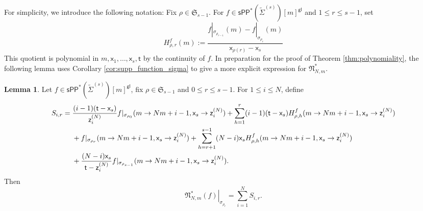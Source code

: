 \documentclass[11pt]{article}
\newcommand{\sPP}{\mathsf{sPP}}
\newcommand{\spp}{\sPP}
\theoremstyle{definition}
\newtheorem{lemma}[definition]{Lemma}
\begin{document}
For simplicity, we introduce the following notation:
Fix $\rho\in \mathfrak S_{s-1}$. For
$f\in \spp^{\ast}(\tilde{\Sigma}^{(s)})[m]^{\mathsf{gl}}$ and $1\le r\le s-1$, set
\[
	H_{\rho,r}^f(m):=
	\frac{f|_{\sigma_{\rho_{r-1}}}(m)-f|_{\sigma_{\rho_r}}(m)}{\mathsf{x}_{\rho(r)}-\mathsf{x}_s}
\]
This quotient is polynomial in $m,\mathsf{x}_1,\dots,\mathsf{x}_s,\mathsf{t}$ by the continuity of $f$.
In preparation for the proof of Theorem \ref{thm:polynomiality}, the following
lemma uses Corollary \ref{cor:supp_function_sigma} to give a more explicit
expression for $\mathfrak N_{N,m}^{\ast}$.

\begin{lemma}
	\label{lem:contribution-formula-m}
	Let $f\in \spp^{\ast}(\tilde{\Sigma}^{(s)})[m]^{\mathsf{gl}}$, fix $\rho\in \mathfrak S_{s-1}$ and $0\le r\le s-1$.
	For $1\le i\le N$, define
	\begin{align}
		S_{i,r}={}&
		\frac{(i-1)(\mathsf{t}-\mathsf{x}_s)}{\mathsf{z}_i^{(N)}}f|_{\sigma_{\rho_0}}(m\to Nm+i-1,\mathsf{x}_s\to \mathsf{z}_i^{(N)})
		+\sum_{h=1}^{r}(i-1)(\mathsf{t}-\mathsf{x}_s)H_{\rho,h}^f(m\to Nm+i-1,\mathsf{x}_s\to \mathsf{z}_i^{(N)})\notag\\
				  &+f|_{\sigma_{\rho_r}}(m\to Nm+i-1,\mathsf{x}_s\to \mathsf{z}_i^{(N)})
				  +\sum_{h=r+1}^{s-1}(N-i)\mathsf{x}_sH_{\rho,h}^f(m\to Nm+i-1,\mathsf{x}_s\to \mathsf{z}_i^{(N)})\notag\\
				  &+\frac{(N-i)\mathsf{x}_s}{\mathsf{t}-\mathsf{z}_i^{(N)}}f|_{\sigma_{\rho_{s-1}}}(m\to Nm+i-1,\mathsf{x}_s\to \mathsf{z}_i^{(N)}).
				  \label{eq:contribution-formula-m}
	\end{align}
	Then
	\[
		\left.\mathfrak N_{N,m}^\ast(f)\right|_{\sigma_{\rho_r}}=\sum_{i=1}^N S_{i,r}.
	\]
\end{lemma}
\end{document}
